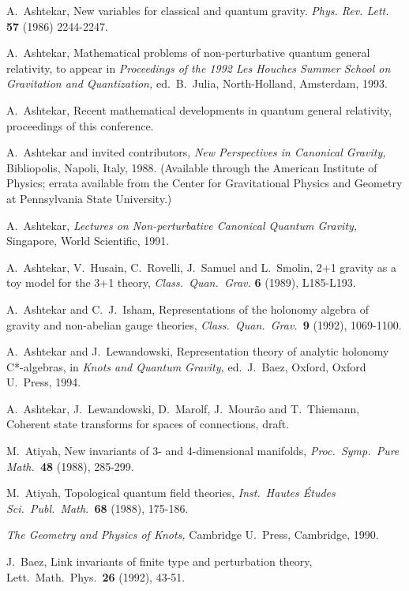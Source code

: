 \begin{thebibliography}{10}

 A.\ Ashtekar,
New variables for classical and quantum gravity.
{\em Phys. Rev. Lett.} {\bf 57} (1986) 2244-2247.

A.\ Ashtekar,
Mathematical problems of non-perturbative quantum general relativity,
to appear in {\sl Proceedings of the 1992 Les Houches Summer School on
Gravitation and Quantization,} ed.\ B.\ Julia, North-Holland, Amsterdam,
1993.

 A.\ Ashtekar, Recent mathematical developments in
quantum general relativity, proceedings of this conference.

A.\ Ashtekar and invited contributors, {\sl New Perspectives in
Canonical Gravity,}
Bibliopolis, Napoli, Italy, 1988.  (Available through the American
Institute of Physics; errata available from the Center for
Gravitational Physics and Geometry at Pennsylvania State University.)

A.\ Ashtekar,
{\sl Lectures on Non-perturbative Canonical Quantum
Gravity,} Singapore, World Scientific, 1991.

 A.\ Ashtekar, V.\ Husain, C.\ Rovelli, J.\ Samuel
and L.\ Smolin, 2+1 gravity as a toy model for the 3+1 theory,
{\sl Class.\ Quan.\ Grav.} {\bf 6} (1989), L185-L193.

 A.\ Ashtekar and C.\ J.\ Isham, Representations of the holonomy
algebra of gravity and non-abelian gauge theories, {\sl Class.\
Quan.\ Grav.\ }{\bf 9} (1992), 1069-1100.

 A.\ Ashtekar and J.\ Lewandowski, Representation
theory of analytic holonomy C*-algebras, in {\sl Knots and
Quantum Gravity,} ed.\ J.\ Baez, Oxford, Oxford U.\ Press, 1994.

 A.\ Ashtekar, J.\ Lewandowski, D.\ Marolf,
J.\ Mour\~ao and T.\ Thiemann, Coherent state transforms for spaces of
connections, draft.

 M.\ Atiyah, New invariants of 3- and 4-dimensional
manifolds, {\sl Proc.\ Symp.\ Pure Math.\ }{\bf 48} (1988), 285-299.

  M.\ Atiyah, Topological quantum field theories,
{\sl Inst.\ Hautes \'Etudes Sci.\ Publ.\ Math.\ }{\bf 68} (1988), 175-186.

{\sl The Geometry and Physics of Knots,} Cambridge U.\ Press, Cambridge, 1990.

 J.\ Baez,
Link invariants of finite type and perturbation theory, Lett.\ Math.\ Phys.\
{\bf 26} (1992), 43-51.


\end{thebibliography}
